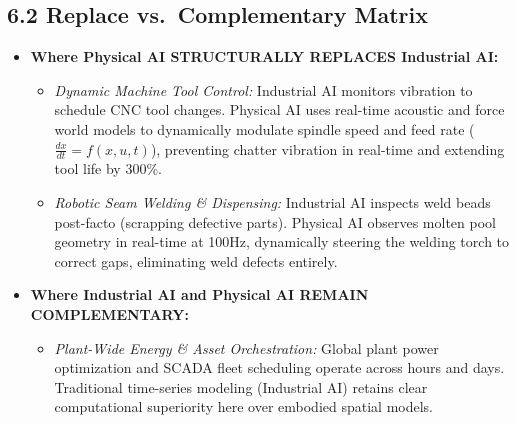 \documentclass[11pt,a4paper]{article}
\begin{document}
\subsection{6.2 Replace vs.\ Complementary Matrix}
\begin{itemize}
    \item \textbf{Where Physical AI STRUCTURALLY REPLACES Industrial AI:}
    \begin{itemize}
        \item \textit{Dynamic Machine Tool Control:} Industrial AI monitors vibration to schedule CNC tool changes. Physical AI uses real-time acoustic and force world models to dynamically modulate spindle speed and feed rate ($\frac{dx}{dt} = f(x,u,t)$), preventing chatter vibration in real-time and extending tool life by 300\%.
        \item \textit{Robotic Seam Welding \& Dispensing:} Industrial AI inspects weld beads post-facto (scrapping defective parts). Physical AI observes molten pool geometry in real-time at 100Hz, dynamically steering the welding torch to correct gaps, eliminating weld defects entirely.
    \end{itemize}

    \item \textbf{Where Industrial AI and Physical AI REMAIN COMPLEMENTARY:}
    \begin{itemize}
        \item \textit{Plant-Wide Energy \& Asset Orchestration:} Global plant power optimization and SCADA fleet scheduling operate across hours and days. Traditional time-series modeling (Industrial AI) retains clear computational superiority here over embodied spatial models.
    \end{itemize}
\end{itemize}
\end{document}
